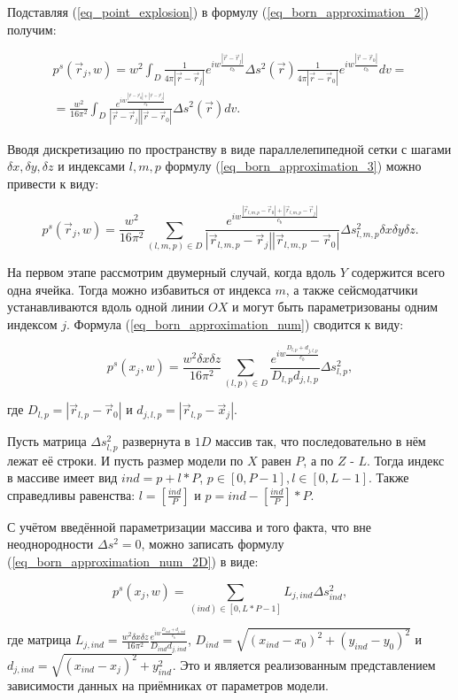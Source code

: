 \documentclass{article}
\begin{document}
Подставляя (\ref{eq_point_explosion}) в формулу (\ref{eq_born_approximation_2}) получим:

\begin{eqnarray}
\label{eq_born_approximation_3}
p^s(\vec{r}_j, w) = w^2\int_D \frac{1}{4\pi|\vec{r}-\vec{r}_j|}e^{iw\frac{|\vec{r}-\vec{r}_j|}{c_b}} \Delta s^2(\vec{r})\frac{1}{4\pi|\vec{r}-\vec{r}_0|}e^{iw\frac{|\vec{r}-\vec{r}_0|}{c_b}}  dv = \nonumber \\
= \frac{w^2}{16\pi^2} \int_D \frac{e^{iw\frac{|\vec{r}-\vec{r}_0| + |\vec{r}-\vec{r}_j|}{c_b}}}{|\vec{r}-\vec{r}_j||\vec{r}-\vec{r}_0|} \Delta s^2(\vec{r}) dv.
\end{eqnarray}

Вводя дискретизацию по пространству в виде параллелепипедной сетки с шагами $\delta x, \delta y, \delta z$ и индексами $l, m, p$ формулу (\ref{eq_born_approximation_3}) можно
привести к виду:

\begin{equation}
\label{eq_born_approximation_num}
p^s(\vec{r}_j, w) = \frac{w^2}{16\pi^2} \sum_{(l,m,p)\in D} \frac{e^{iw\frac{|\vec{r}_{l,m,p}-\vec{r}_0| + |\vec{r}_{l,m,p}-\vec{r}_j|}{c_b}}}{|\vec{r}_{l,m,p}-\vec{r}_j||\vec{r}_{l,m,p}-\vec{r}_0|} \Delta s_{l,m,p}^2 \delta x \delta y \delta z.
\end{equation}

На первом этапе рассмотрим двумерный случай, когда вдоль $Y$ содержится всего одна ячейка.
Тогда можно избавиться от индекса $m$, а также сейсмодатчики устанавливаются вдоль одной линии $OX$ и могут быть параметризованы одним индексом $j$.
Формула (\ref{eq_born_approximation_num}) сводится к виду:

\begin{equation}
\label{eq_born_approximation_num_2D}
p^s(x_j, w) = \frac{w^2 \delta x \delta z}{16\pi^2} \sum_{(l,p)\in D} \frac{e^{iw\frac{D_{l,p}+d_{j,l,p}}{c_b}}}{D_{l,p}d_{j,l,p}} \Delta s_{l,p}^2,
\end{equation}

где $D_{l,p}=|\vec{r}_{l,p}-\vec{r}_0|$ и $d_{j,l,p}=|\vec{r}_{l,p}-\vec{x}_j|$.

Пусть матрица $\Delta s_{l,p}^2$ развернута в $1D$ массив так, что последовательно в нём лежат её строки.
И пусть размер модели по $X$ равен $P$, а по $Z$ - $L$.
Тогда индекс в массиве имеет вид $ind = p + l * P$, $p \in [0, P - 1], l \in [0, L - 1]$.
Также справедливы равенства: $l = [\frac{ind}{P}]$ и $p = ind - [\frac{ind}{P}] * P$.

С учётом введённой параметризации массива и того факта, что вне неоднородности $\Delta s^2 = 0$, можно записать формулу (\ref{eq_born_approximation_num_2D}) в виде:

\begin{equation}
\label{eq_born_approximation_num_2D_ind}
p^s(x_j, w) = \sum_{(ind)\in [0, L * P - 1]} L_{j,ind} \Delta s_{ind}^2,
\end{equation}

где матрица $L_{j,ind} = \frac{w^2 \delta x \delta z}{16\pi^2} \frac{e^{iw\frac{D_{ind}+d_{j,ind}}{c_b}}}{D_{ind}d_{j,ind}}$,
$D_{ind}=\sqrt{(x_{ind} - x_0)^2 + (y_{ind} - y_0)^2}$ и $d_{j,ind}=\sqrt{(x_{ind} - x_j)^2 + y_{ind}^2}$.
Это и является реализованным представлением зависимости данных на приёмниках от параметров модели.
\end{document}
